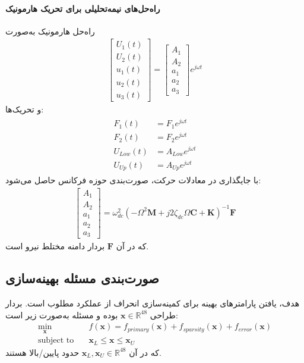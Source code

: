 \paragraph{راه‌حل‌های نیمه‌تحلیلی برای تحریک هارمونیک}
راه‌حل هارمونیک به‌صورت
\begin{align}\label{Eq.harmonic.solution.2dof3dof}
    \begin{bmatrix}
        U_1(t) \\
        U_2(t) \\
        u_1(t) \\
        u_2(t) \\
        u_3(t)
    \end{bmatrix} =
    \begin{bmatrix}
        A_1 \\
        A_2 \\
        a_1 \\
        a_2 \\
        a_3
    \end{bmatrix} e^{j \omega t}
\end{align}
و تحریک‌ها:
\begin{align}\label{Eq.harmonic.excitations.2dof3dof}
    \begin{split}
        F_1(t) &= F_1 e^{j \omega t} \\
        F_2(t) &= F_2 e^{j \omega t} \\
        U_{Low}(t) &= A_{Low} e^{j \omega t} \\
        U_{Up}(t) &= A_{Up} e^{j \omega t}
    \end{split}
\end{align}
با جایگذاری در معادلات حرکت، صورت‌بندی حوزه فرکانس حاصل می‌شود:
\begin{align}\label{Eq.frequency.domain.2dof3dof}
    \begin{bmatrix}
        A_1 \\
        A_2 \\
        a_1 \\
        a_2 \\
        a_3
    \end{bmatrix} = \omega_{dc}^2 \left( -\Omega^2 \mathbf{M} + j 2 \zeta_{dc} \Omega \mathbf{C} + \mathbf{K} \right)^{-1} \mathbf{F}
\end{align}
که در آن $\mathbf{F}$ بردار دامنه مختلط نیرو است.

\subsection{صورت‌بندی مسئله بهینه‌سازی}
هدف، یافتن پارامترهای بهینه  برای کمینه‌سازی انحراف از عملکرد مطلوب است. بردار طراحی $\mathbf{x}\in\mathbb{R}^{48}$ بوده و مسئله به‌صورت زیر است:
\begin{equation}\label{Eq.optimization_problem}
\begin{aligned}
\min_{\mathbf{x}} \quad & f(\mathbf{x}) = f_{primary}(\mathbf{x}) + f_{sparsity}(\mathbf{x}) + f_{error}(\mathbf{x}) \\
\text{subject to} \quad & \mathbf{x}_L \le \mathbf{x} \le \mathbf{x}_U
\end{aligned}
\end{equation}
که در آن $\mathbf{x}_L,\mathbf{x}_U\in\mathbb{R}^{48}$ حدود پایین/بالا هستند.

